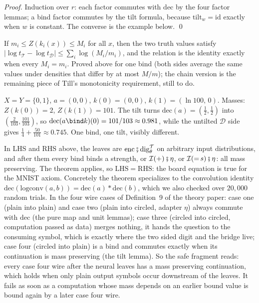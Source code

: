 \documentclass[anon]{../../journal-templates/NeSy26/nesy2026} %
\begin{document}
\begin{description}
\begin{theorem}
\emph{Proof.} Induction over $r$: each factor commutes with $\mathrm{dec}$
by the four factor lemmas; a bind factor commutes by the tilt formula,
because $\mathrm{tilt}_w = \mathrm{id}$ exactly when $w$ is constant. The
converse is the example below. \qed
\end{theorem}

\begin{corollary}
If $m_i \le Z(k_i(x)) \le M_i$ for all $x$, then the two truth values
satisfy
$\bigl|\log t_{\mathcal T} - \log t_{\mathcal D}\bigr|
 \le \sum_i \log (M_i / m_i)$,
and the relation is the identity exactly when every $M_i = m_i$. Proved
above for one bind (both sides average the same values under densities
that differ by at most $M/m$); the chain version is the remaining piece of
Till's monotonicity requirement, still to do.
\end{corollary}

\begin{example}
$X = Y = \{0,1\}$, $a = (0,0)$, $k(0) = (0,0)$, $k(1) = (\ln 100,\, 0)$.
Masses: $Z(k(0)) = 2$, $Z(k(1)) = 101$. The tilt turns
$\mathrm{dec}(a) = (\tfrac12, \tfrac12)$ into
$(\tfrac{2}{103}, \tfrac{101}{103})$, so
$\mathrm{dec}(a \bind k)(0) = 101/103 \approx 0.981$, while the untilted
$\mathcal D$ side gives
$\tfrac14 + \tfrac{50}{101} \approx 0.745$. One bind, one tilt, visibly
different.
\end{example}

\begin{example}
In LHS and RHS above, the leaves are
$\mathrm{enc} \fatsemi \mathrm{dig}^{\mathcal T}_\theta$ on arbitrary input
distributions, and after them every bind binds a strength, or
$\mathcal I(+) \fatsemi \eta$, or $\mathcal I({=}\,s) \fatsemi \eta$: all
mass preserving. The theorem applies, so $\mathrm{LHS} = \mathrm{RHS}$: the
board equation is true for the MNIST axiom. Concretely the theorem
specializes to the convolution identity
$\mathrm{dec}(\mathrm{logconv}(a,b)) = \mathrm{dec}(a) * \mathrm{dec}(b)$,
which we also checked over $20{,}000$ random trials. In the four wire
cases of
Definition~9 of the theory paper: case one (plain into plain) and case two
(plain into circled, adapter $\eta$) always commute with $\mathrm{dec}$
(the pure map and unit lemmas); case three (circled into circled,
computation passed as data) merges nothing, it hands the question to the
consuming symbol, which is exactly where the two sided digit and the
bridge live; case four (circled into plain) is a bind and commutes exactly
when its continuation is mass preserving (the tilt lemma). So the safe
fragment reads: every case four wire after the neural leaves has a mass
preserving continuation, which holds when only plain output symbols occur
downstream of the leaves. It fails as soon as a computation whose mass
depends on an earlier bound value is bound again by a later case four
wire.
\end{example}


\end{description}
\end{document}
